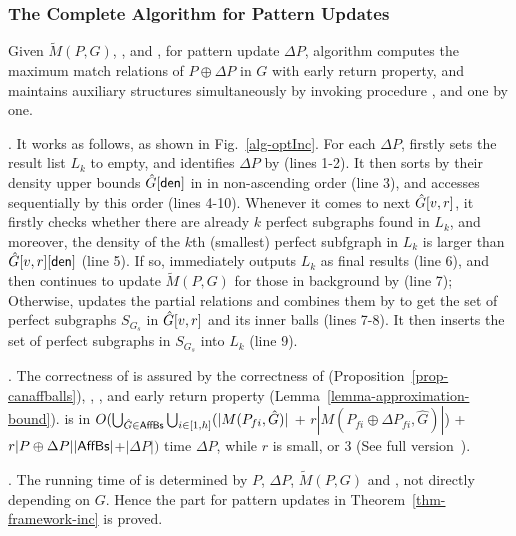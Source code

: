 \subsubsection{The Complete Algorithm for Pattern Updates}
\label{subsubsec-completedynamicP}

Given $\tilde{M}(P,G)$, \fb, \bfc and \upl, for pattern update $\Delta P$,
algorithm \incp computes the maximum match relations of $P \oplus \Delta P$ in $G$ with early return property, and maintains auxiliary structures simultaneously by invoking procedure \identifyaffball, \incmatch and \comb one by one.

. It works as follows, as shown in Fig.~\ref{alg-optInc}.
For each $\Delta P$, \incp firstly sets the result list $L_{k}$ to empty,
and identifies \affballsx \wrt $\Delta P$ by \identifyaffball (lines 1-2).
It then sorts \affballsx by their density upper bounds $\hat{G}{}[{\mathsf{den}}]$ in \bs in non-ascending order (line 3),
and accesses \affballsx sequentially by this order (lines 4-10).
Whenever it comes to next \affballx $\hat{G}{[v,r]}$, it firstly checks whether there are already $k$ perfect subgraphs found in $L_{k}$, and moreover,
the density of the $k$th (smallest) perfect subfgraph in $L_{k}$ is larger than $\hat{G}{[v,r]}[{\mathsf{den}}]$ (line 5).
If so, \incp immediately outputs $L_{k}$ as final results (line 6),
and then continues to update $\tilde{M}(P,G)$ for those \affballsx in background by \incmatch (line 7);
Otherwise, \incp updates the partial relations and combines them by \comb to get the set of perfect subgraphs $S_{G_s}$ in $\hat{G}{[v,r]}$ and its inner balls (lines 7-8).
It then inserts the set of perfect subgraphs in $S_{G_s}$ into $L_{k}$ (line 9).

.
The correctness of \incp is assured by the correctness of \identifyaffball (Proposition~\ref{prop-canaffballs}), \incmatch, \comb, and early return property (Lemma~\ref{lemma-approximation-bound}).
\incp is in $O(\bigcup_{\hat{G}\in {\ensuremath {\mathsf{AffBs}}}}\bigcup_{i\in[1,h]}(|M(P_{fi}, \hat{G})|$ + $r|M(P_{fi} \oplus \Delta P_{fi}, \hat{G})|$) + $r|P \oplus \Delta P||{\mathsf{AffBs}}|$+$|\Delta P|)$ time \wrt $\Delta P$, while $r$ is small,  or 3 (See full version~\cite{fullvldb18}).


. The running time of \incp is determined by $P$, $\Delta P$, $\tilde{M}(P,G)$ and \affballsx, not directly depending on $G$.
Hence the part for pattern updates in Theorem~\ref{thm-framework-inc} is proved.



